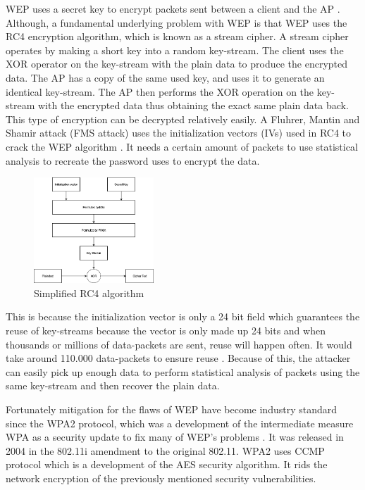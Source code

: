 WEP uses a secret key to encrypt packets sent between a client and the AP \cite{WEP2}. Although, a fundamental underlying problem with WEP is that WEP uses the RC4 encryption algorithm, which is known as a stream cipher. A stream cipher operates by making a short key into a random key-stream. The client uses the XOR operator on the key-stream with the plain data to produce the encrypted data. The AP has a copy of the same used key, and uses it to generate an identical key-stream. The AP then performs the XOR operation on the key-stream with the encrypted data thus obtaining the exact same plain data back. This type of encryption can be decrypted relatively easily. A Fluhrer, Mantin and Shamir attack (FMS attack) uses the initialization vectors (IVs) used in RC4 to crack the WEP algorithm \cite{Weakness}. It needs a certain amount of packets to use statistical analysis to recreate the password uses to encrypt the data.

\begin{figure}[!htbp]
    \centering
    \includegraphics[width=0.4\textwidth]{Latex-Files/Billeder/RC4.png}
    \caption{Simplified RC4 algorithm \cite{geeks}}
    \label{RC4}
\end{figure}

This is because the initialization vector is only a 24 bit field which guarantees the reuse of key-streams because the vector is only made up 24 bits and when thousands or millions of data-packets are sent, reuse will happen often. It would take around 110.000 data-packets to ensure reuse \cite{Random_map}. Because of this, the attacker can easily pick up enough data to perform statistical analysis of packets using the same key-stream and then recover the plain data.

Fortunately mitigation for the flaws of WEP have become industry standard since the WPA2 protocol, which was a development of the intermediate measure WPA as a security update to fix many of WEP's problems \cite{WPA2_1}\cite{WEP3}. It was released in 2004 in the 802.11i amendment to the original 802.11. WPA2 uses CCMP protocol which is a development of the AES security algorithm. It rids the network encryption of the previously mentioned security vulnerabilities. 


